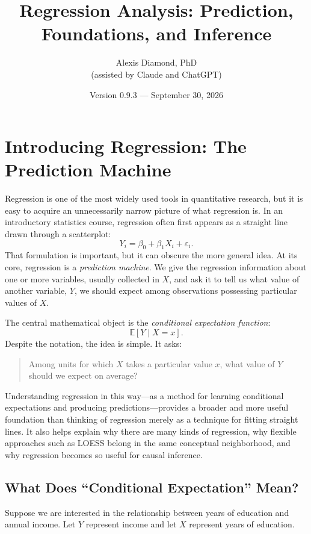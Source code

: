 \documentclass[11pt]{report}
\title{\textbf{Regression Analysis: Prediction, Foundations, and Inference}}
\author{Alexis Diamond, PhD\\[4pt] {\normalsize (assisted by Claude and ChatGPT)}}
\date{Version 0.9.3 --- September 30, 2026}
\newcommand{\E}{\mathbb{E}}
\begin{document}
\maketitle
\tableofcontents
\clearpage

\chapter{Introducing Regression: The Prediction Machine}
\label{chap:intro}

Regression is one of the most widely used tools in quantitative research, but it is easy to acquire an unnecessarily narrow picture of what regression is. In an introductory statistics course, regression often first appears as a straight line drawn through a scatterplot:
\[
Y_i = \beta_0 + \beta_1 X_i + \varepsilon_i.
\]
That formulation is important, but it can obscure the more general idea. At its core, regression is a \emph{prediction machine}. We give the regression information about one or more variables, usually collected in \(X\), and ask it to tell us what value of another variable, \(Y\), we should expect among observations possessing particular values of \(X\).

The central mathematical object is the \emph{conditional expectation function}:
\[
\E[Y\mid X=x].
\]
Despite the notation, the idea is simple. It asks:

\begin{quote}
Among units for which \(X\) takes a particular value \(x\), what value of \(Y\) should we expect on average?
\end{quote}

Understanding regression in this way---as a method for learning conditional expectations and producing predictions---provides a broader and more useful foundation than thinking of regression merely as a technique for fitting straight lines. It also helps explain why there are many kinds of regression, why flexible approaches such as LOESS belong in the same conceptual neighborhood, and why regression becomes so useful for causal inference.

\section{What Does ``Conditional Expectation'' Mean?}

Suppose we are interested in the relationship between years of education and annual income. Let \(Y\) represent income and let \(X\) represent years of education.
\end{document}

